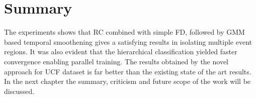 \section{Summary}
The experiments shows that RC combined with simple FD,  followed by GMM based temporal smoothening gives a satisfying results in isolating multiple event regions.  It was also evident that the  hierarchical classification yielded  faster convergence enabling parallel training.  The results obtained by the novel approach  for UCF dataset is far better than the existing state of the art results.  In the next chapter the summary, criticism and future scope of the work will be discussed.